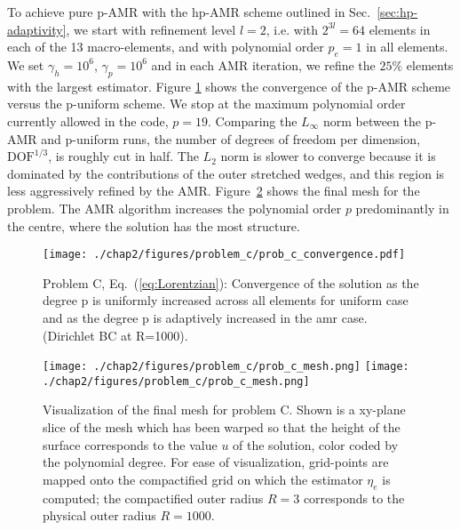To achieve pure p-AMR with the hp-AMR scheme
outlined in Sec.~\ref{sec:hp-adaptivity}, we
start with refinement level $l=2$, i.e. with $2^{3 l}=64$ elements in each of the 13 macro-elements, and with polynomial order $p_e=1$ in all elements. We
set $\gamma_h\! =\! 10^6$,
$\gamma_p\! =\! 10^6$ and in each AMR iteration, we refine the $25\%$ elements with the
largest estimator. Figure \ref{fig:prob_c_convergence} shows the
convergence of the p-AMR scheme versus the p-uniform scheme.  We stop
at the maximum polynomial order currently allowed in the
code, $p\!=\!19$. Comparing the $L_\infty$ norm between the p-AMR and p-uniform
runs, the number of degrees of freedom per dimension,
$\mbox{DOF}^{1/3}$, is roughly cut in half.
The $L_2$ norm is slower
to converge because it is dominated by the contributions of the outer
stretched wedges, and this region is less aggressively refined by the
AMR.
Figure~\ref{fig:problem_c_mesh} shows the
final mesh for the problem.  The AMR algorithm increases the polynomial order $p$ predominantly in the centre, where the solution has the most structure.

\begin{figure}[ht!]
  \centering
  \texttt{[image: ./chap2/figures/problem\_c/prob\_c\_convergence.pdf]}
  \caption{ \label{fig:prob_c_convergence} Problem C,
    Eq.~(\ref{eq:Lorentzian}): Convergence of the solution as the degree p is uniformly
    increased across all elements for uniform case and as the degree p
    is adaptively increased in the amr case.  (Dirichlet BC at
    R=1000).
  }
\end{figure}

\begin{figure}[ht!]
  \centering
\texttt{[image: ./chap2/figures/problem\_c/prob\_c\_mesh.png]}
    \texttt{[image: ./chap2/figures/problem\_c/prob\_c\_mesh.png]}
  \caption{ Visualization of the final mesh for problem C. Shown is a
    xy-plane slice of the mesh which has been warped so that the
    height of the surface corresponds to the value $u$ of the
    solution, color coded by the polynomial degree. For ease of visualization, grid-points are mapped onto the compactified grid on which the estimator $\eta_e$ is computed; the compactified outer radius $R=3$ corresponds to the physical outer radius $R=1000$.}
  \label{fig:problem_c_mesh}
\end{figure}

